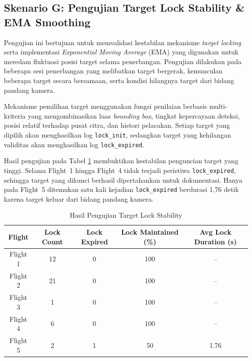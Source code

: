 \subsection{Skenario G: Pengujian Target Lock Stability \& EMA Smoothing}

Pengujian ini bertujuan untuk memvalidasi kestabilan mekanisme \textit{target locking} serta implementasi \textit{Exponential Moving Average} (EMA) yang digunakan untuk meredam fluktuasi posisi target selama penerbangan. Pengujian dilakukan pada beberapa sesi penerbangan yang melibatkan target bergerak, kemunculan beberapa target secara bersamaan, serta kondisi hilangnya target dari bidang pandang kamera.

Mekanisme pemilihan target menggunakan fungsi penilaian berbasis multi-kriteria yang mengombinasikan luas \textit{bounding box}, tingkat kepercayaan deteksi, posisi relatif terhadap pusat citra, dan histori pelacakan. Setiap target yang dipilih akan menghasilkan log \texttt{lock\_init}, sedangkan target yang kehilangan validitas akan menghasilkan log \texttt{lock\_expired}.

Hasil pengujian pada Tabel \ref{tab:lock_stability} membuktikan kestabilan penguncian target yang tinggi. Selama Flight~1 hingga Flight~4 tidak terjadi peristiwa \texttt{lock\_expired}, sehingga target yang dikunci berhasil dipertahankan untuk dokumentasi. Hanya pada Flight~5 ditemukan satu kali kejadian \texttt{lock\_expired} berdurasi 1,76 detik karena target keluar dari bidang pandang kamera.

\begin{table}[H]
	\centering
	\caption{Hasil Pengujian Target Lock Stability}
	\label{tab:lock_stability}
	\renewcommand{\arraystretch}{1.2}
	\small
	\begin{tabular}{|c|c|c|c|c|}
		\hline
		\textbf{Flight} &
		\textbf{Lock Count} &
		\textbf{Lock Expired} &
		\textbf{Lock Maintained (\%)} &
		\textbf{Avg Lock Duration (s)}
		\\ \hline
		
		Flight 1 & 12 & 0 & 100 & -- \\ \hline
		Flight 2 & 21 & 0 & 100 & -- \\ \hline
		Flight 3 & 1 & 0 & 100 & -- \\ \hline
		Flight 4 & 6 & 0 & 100 & -- \\ \hline
		Flight 5 & 2 & 1 & 50 & 1.76 \\ \hline
		
	\end{tabular}
\end{table}


